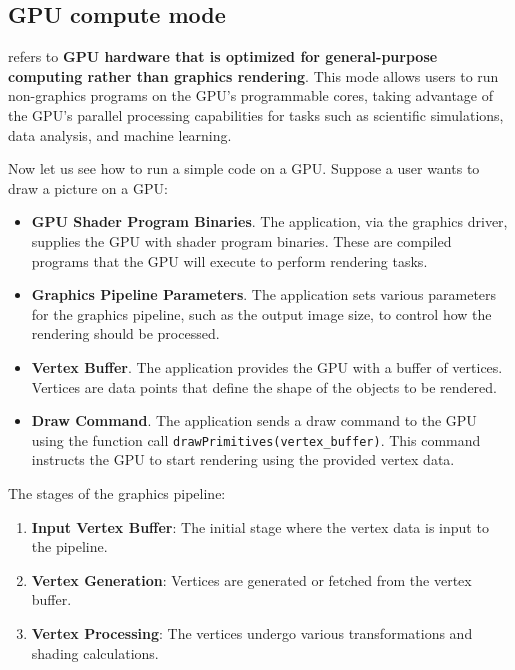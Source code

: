 \subsection{GPU compute mode}

 refers to \textbf{GPU hardware that is optimized for general-purpose computing rather than graphics rendering}. This mode allows users to run non-graphics programs on the GPU's programmable cores, taking advantage of the GPU's parallel processing capabilities for tasks such as scientific simulations, data analysis, and machine learning.

\begin{examplebox}
    Now let us see how to run a simple code on a GPU. Suppose a user wants to draw a picture on a GPU:
    \begin{itemize}
        \item \textbf{GPU Shader Program Binaries}. The application, via the graphics driver, supplies the GPU with shader program binaries. These are compiled programs that the GPU will execute to perform rendering tasks.
        
        \item \textbf{Graphics Pipeline Parameters}. The application sets various parameters for the graphics pipeline, such as the output image size, to control how the rendering should be processed.
        
        \item \textbf{Vertex Buffer}. The application provides the GPU with a buffer of vertices. Vertices are data points that define the shape of the objects to be rendered.
        
        \item \textbf{Draw Command}. The application sends a draw command to the GPU using the function call \texttt{drawPrimitives(vertex\_buffer)}. This command instructs the GPU to start rendering using the provided vertex data.
    \end{itemize}
    The stages of the graphics pipeline:
    \begin{enumerate}
        \item \textbf{Input Vertex Buffer}: The initial stage where the vertex data is input to the pipeline.

        \item \textbf{Vertex Generation}: Vertices are generated or fetched from the vertex buffer.
        
        \item \textbf{Vertex Processing}: The vertices undergo various transformations and shading calculations.
        

\end{enumerate}
\end{examplebox}
